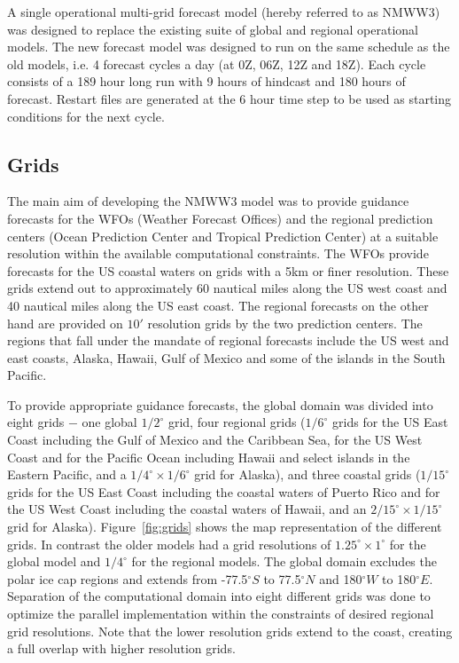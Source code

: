 \documentclass[12pt]{article}
\newcommand{\degree}{^\circ}
\begin{document}
A single operational multi-grid forecast model (hereby referred to as
NMWW3) was designed to replace the existing suite of global and
regional operational models. The new forecast model was designed to
run on the same schedule as the old models, i.e. 4 forecast cycles a
day (at 0Z, 06Z, 12Z and 18Z). Each cycle consists of a 189 hour long
run with 9 hours of hindcast and 180 hours of forecast. Restart files
are generated at the 6 hour time step to be used as starting
conditions for the next cycle.

\subsection{Grids}

The main aim of developing the NMWW3 model was to provide guidance
forecasts for the WFOs (Weather Forecast Offices) and the regional
prediction centers (Ocean Prediction Center and Tropical Prediction
Center) at a suitable resolution within the available
computational constraints. The WFOs provide forecasts for the US
coastal waters on grids with a 5km or finer resolution. These grids
extend out to approximately 60 nautical miles along the US west coast
and 40 nautical miles along the US east coast. The regional forecasts
on the other hand are provided on $10'$ resolution grids by the two
prediction centers. The regions that fall under the mandate of
regional forecasts include the US west and east coasts, Alaska,
Hawaii, Gulf of Mexico and some of the islands in the South Pacific.

To provide appropriate guidance forecasts, the global domain was
divided into eight grids $-$ one global $1/2\degree$ grid, four
regional grids ($1/6\degree$ grids for the US East Coast including the
Gulf of Mexico and the Caribbean Sea, for the US West Coast and for
the Pacific Ocean including Hawaii and select islands in the Eastern
Pacific, and a $1/4\degree \times 1/6\degree$ grid for Alaska), and
three coastal grids ($1/15\degree$ grids for the US East Coast
including the coastal waters of Puerto Rico and for the US West Coast
including the coastal waters of Hawaii, and an $2/15\degree \times
1/15\degree$ grid for Alaska). Figure~\ref{fig:grids} shows the map
representation of the different grids. In contrast the older models
had a grid resolutions of $1.25\degree \times 1\degree$ for the global
model and $1/4\degree$ for the regional models. The global domain
excludes the polar ice cap regions and extends from -77.5$\degree S$
to 77.5$\degree N$ and 180$\degree W$ to 180$\degree E$. Separation of
the computational domain into eight different grids was done to
optimize the parallel implementation within the constraints of desired
regional grid resolutions. Note that the lower resolution grids extend
to the coast, creating a full overlap with higher resolution grids.
\end{document}
